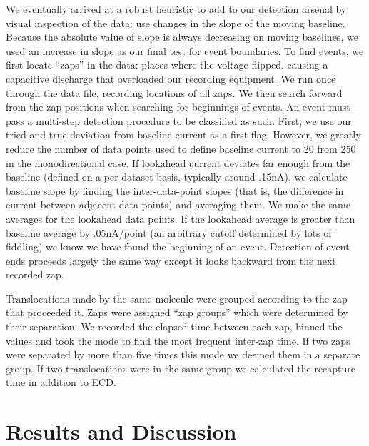 \documentclass[aps,prl,preprint,groupedaddress]{revtex4}
\begin{document}
We eventually arrived at a robust heuristic to add to our detection arsenal by visual inspection of the data: use changes in the slope of the moving baseline.
Because the absolute value of slope is always decreasing on moving baselines, we used an increase in slope as our final test for event boundaries.
To find events, we first locate ``zaps'' in the data: places where the voltage flipped, causing a capacitive discharge that overloaded our recording equipment.
We run once through the data file, recording locations of all zaps.
We then search forward from the zap positions when searching for beginnings of events.
An event must pass a multi-step detection procedure to be classified as such.
First, we use our tried-and-true deviation from baseline current as a first flag.
However, we greatly reduce the number of data points used to define baseline current to 20 from 250 in the monodirectional case.
If lookahead current deviates far enough from the baseline (defined on a per-dataset basis, typically around .15nA), we calculate baseline slope by finding the inter-data-point slopes (that is, the difference in current between adjacent data points) and averaging them.
We make the same averages for the lookahead data points.
If the lookahead average is greater than baseline average by .05nA/point (an arbitrary cutoff determined by lots of fiddling) we know we have found the beginning of an event.
Detection of event ends proceeds largely the same way except it looks backward from the next recorded zap.

Translocations made by the same molecule were grouped according to the zap that proceeded it.
Zaps were assigned ``zap groups'' which were determined by their separation.
We recorded the elapsed time between each zap, binned the values and took the mode to find the most frequent inter-zap time.
If two zaps were separated by more than five times this mode we deemed them in a separate group.
If two translocations were in the same group we calculated the recapture time in addition to ECD.

\section{Results and Discussion}
\end{document}
